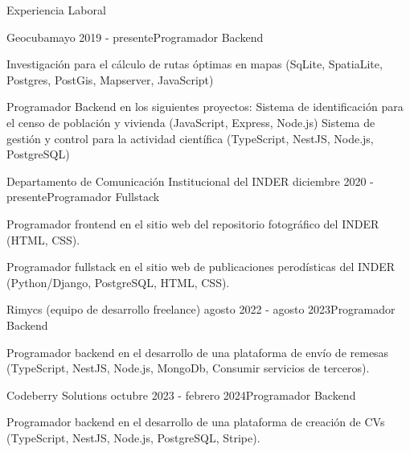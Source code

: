 \documentclass{resume}
\begin{document}
	
	\begin{rSection}{Experiencia Laboral}
		\begin{rSubsection}{Geocuba}{mayo 2019 - presente}{Programador Backend}{}
			\item Investigación para el cálculo de rutas óptimas en mapas
				\subitem (SqLite, SpatiaLite, Postgres, PostGis, Mapserver, JavaScript)
			\item Programador Backend en los siguientes proyectos: 
				\subitem Sistema de identificación para el censo de población y vivienda 
					\subsubitem (JavaScript, Express, Node.js)
				\subitem Sistema de gestión y control para la actividad científica
					\subsubitem(TypeScript, NestJS, Node.js, PostgreSQL)
		\end{rSubsection}
	
		\begin{rSubsection}{Departamento de Comunicación Institucional del INDER}{ diciembre 2020 - presente}{Programador Fullstack}{}
			\item Programador frontend en el sitio web del repositorio fotográfico del INDER 
				\subitem(HTML, CSS).
			\newline
			\item Programador fullstack en el sitio web de publicaciones perodísticas del INDER 
				\subitem(Python/Django, PostgreSQL, HTML, CSS).
			
		\end{rSubsection}
		
		\begin{rSubsection}{Rimycs (equipo de desarrollo freelance)}{ agosto 2022 - agosto 2023}{Programador Backend}{}
			\item Programador backend en el desarrollo de una plataforma de envío de remesas 
			\subitem(TypeScript, NestJS, Node.js, MongoDb, Consumir servicios de terceros).
			
		\end{rSubsection}	
	
		\begin{rSubsection}{Codeberry Solutions}{ octubre 2023 - febrero 2024}{Programador Backend}{}
			\item Programador backend en el desarrollo de una plataforma de creación de CVs 
			\subitem(TypeScript, NestJS, Node.js, PostgreSQL, Stripe).
			
		\end{rSubsection}	
		
	\end{rSection}
\end{document}

